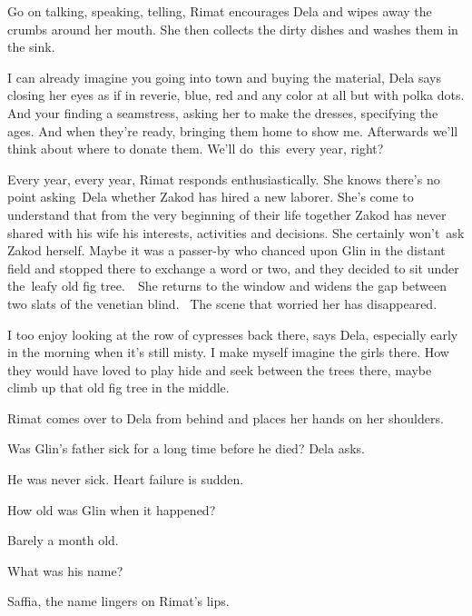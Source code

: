\documentclass[letterpaper]{article}
\begin{document}
{\textquotedbl}Go on talking, speaking, telling,{\textquotedbl} Rimat encourages Dela and wipes away the crumbs around
her mouth. She then collects the dirty dishes and washes them in the sink. 

{\textquotedbl}I can already imagine you going into town and buying the material,{\textquotedbl} Dela says closing her
eyes as if in reverie, {\textquotedbl}blue, red and any color at all but with polka dots. And your finding a
seamstress, asking her to make the dresses, specifying the ages. And when they're ready, bringing them home to show me.
Afterwards we'll think about where to donate them. We'll do\ this\ every year, right?{\textquotedbl}

{\textquotedbl}Every year, every year,{\textquotedbl} Rimat responds enthusiastically. She knows there's no point
asking~Dela whether Zakod has hired a new laborer. She's come to understand that from the very beginning of their life
together Zakod has never shared with his wife his interests, activities and decisions\textcolor{red}{. }She certainly
won't\textcolor{red}{\ }ask Zakod herself. Maybe it was a passer-by who chanced upon Glin in the distant field and
stopped there to exchange a word or two, and they decided to sit under the\textcolor{red}{\ }leafy old fig tree.~\ She
returns to the window and widens the gap between two slats of the venetian blind. ~The scene that worried her has
disappeared. 

{\textquotedbl}I too enjoy looking at the row of cypresses back there,{\textquotedbl} says Dela,
{\textquotedbl}especially early in the morning when it's still misty. I make myself imagine the girls there. How they
would have loved to play hide and seek between the trees there, maybe climb up that old fig tree in the
middle.{\textquotedbl}

Rimat comes over to Dela from behind and places her hands on her shoulders. 

{\textquotedbl}Was Glin's father sick for a long time before he died?{\textquotedbl} Dela asks.

{\textquotedbl}He was never sick. Heart failure is sudden.{\textquotedbl}

{\textquotedbl}How old was Glin when it happened?{\textquotedbl}

{\textquotedbl}Barely a month old.{\textquotedbl}

{\textquotedbl}What was his name?{\textquotedbl}

{\textquotedbl}Saffia,{\textquotedbl} the name lingers on Rimat's lips.
\end{document}

